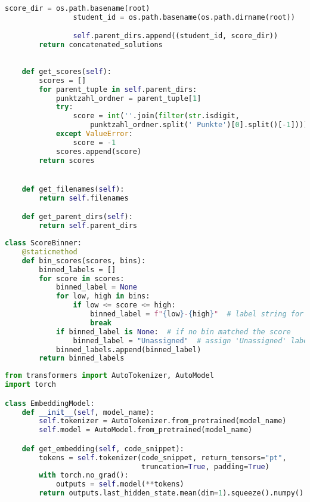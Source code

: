 \begin{lstlisting}[language=Python, caption={\texttt{data\_loader.py}}, label={prco:data-loader}]
                score_dir = os.path.basename(root)
                student_id = os.path.basename(os.path.dirname(root))

                self.parent_dirs.append((student_id, score_dir))
        return concatenated_solutions
    
    
    def get_scores(self):
        scores = []
        for parent_tuple in self.parent_dirs:
            punktzahl_ordner = parent_tuple[1]
            try:
                score = int(''.join(filter(str.isdigit, 
                    punktzahl_ordner.split(' Punkte')[0].split()[-1])))
            except ValueError:
                score = -1
            scores.append(score)
        return scores


    def get_filenames(self):
        return self.filenames

    def get_parent_dirs(self):
        return self.parent_dirs
\end{lstlisting}


\begin{lstlisting}[language=Python, caption={\texttt{score\_binning.py}}, label={prco:score-binning}]
class ScoreBinner:
    @staticmethod
    def bin_scores(scores, bins):
        binned_labels = []
        for score in scores:
            binned_label = None
            for low, high in bins:
                if low <= score <= high:
                    binned_label = f"{low}-{high}"  # label string for bin
                    break
            if binned_label is None:  # if no bin matched the score
                binned_label = "Unassigned"  # assign 'Unassigned' label
            binned_labels.append(binned_label)
        return binned_labels
\end{lstlisting}

\begin{lstlisting}[language=Python, caption={\texttt{embedding\_model.py}}, label={prco:embedding-model}]
from transformers import AutoTokenizer, AutoModel
import torch

class EmbeddingModel:
    def __init__(self, model_name):
        self.tokenizer = AutoTokenizer.from_pretrained(model_name)
        self.model = AutoModel.from_pretrained(model_name)

    def get_embedding(self, code_snippet):
        tokens = self.tokenizer(code_snippet, return_tensors="pt", 
                                truncation=True, padding=True)
        with torch.no_grad():
            outputs = self.model(**tokens)
        return outputs.last_hidden_state.mean(dim=1).squeeze().numpy()
\end{lstlisting}

